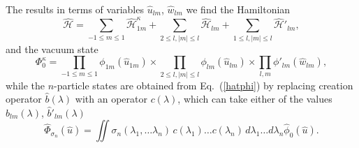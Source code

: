 \documentclass[12pt]{article}
\newcommand{\HH}{\mathscr{H}}
\begin{document}
	The results in terms of variables
$ \hat{u}_{lm} $,
$ \hat{w}_{lm} $
	we find the Hamiltonian
\begin{equation*}
    \hat{\HH} = \sum_{-1\leq m\leq 1} \hat{\HH}_{1m}^{\kappa}
	+ \sum_{2\leq l, |m|\leq l} \hat{\HH}_{lm}
	+ \sum_{1\leq l, |m|\leq l} \hat{\HH}'_{lm} ,
\end{equation*}
	and the vacuum state
\begin{equation*}
    \Phi_{0}^{\kappa} = \prod_{-1\leq m \leq 1} \phi_{1m}(\hat{u}_{1m}) \times
    \prod_{2\leq l, |m|\leq l} \phi_{lm}(\hat{u}_{lm}) \times
	\prod_{l,m} \phi'_{lm}(\hat{w}_{lm}) ,
\end{equation*}
	while the
$ n $-particle states are obtained from
Eq.~(\ref{hatphi})
	by replacing creation operator
$ \hat{b}(\lambda) $ with an operator
$ c(\lambda) $,
	which can take either of the values
$ \hat{b}_{lm}(\lambda) $, $ \hat{b}'_{lm}(\lambda) $
\begin{equation*}
    \hat{\Phi}_{\sigma_{n}}(\hat{u}) = \iint
    \sigma_{n} (\lambda_{1},\ldots \lambda_{n}) \,
	c(\lambda_{1}) \ldots c(\lambda_{n}) \,
    d\lambda_{1} \ldots d\lambda_{n} \hat{\phi}_{0}(\hat{u}) .
\end{equation*}




\end{document}
